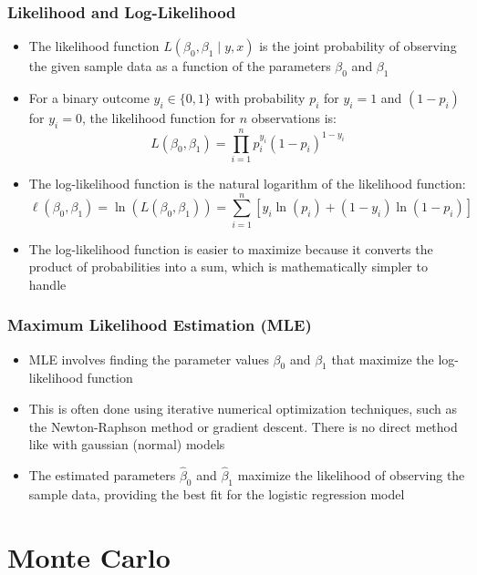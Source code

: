 \documentclass{article}
\begin{document}
\subsubsection{Likelihood and Log-Likelihood}

\begin{itemize}
    \item The likelihood function $L(\beta_0, \beta_1 \mid y, x)$ is the joint probability of observing the given sample data as a function of the parameters $\beta_0$ and $\beta_1$
    \item For a binary outcome $y_i \in \{0,1\}$ with probability $p_i$ for $y_i=1$ and $(1-p_i)$ for $y_i=0$, the likelihood function for $n$ observations is:
    \[
    L(\beta_0, \beta_1) = \prod_{i=1}^{n} p_i^{y_i} (1-p_i)^{1-y_i}
    \]
    \item The log-likelihood function is the natural logarithm of the likelihood function:
    \[
    \ell(\beta_0, \beta_1) = \ln(L(\beta_0, \beta_1)) = \sum_{i=1}^{n} \left[ y_i \ln(p_i) + (1-y_i) \ln(1-p_i) \right]
    \]
    \item The log-likelihood function is easier to maximize because it converts the product of probabilities into a sum, which is mathematically simpler to handle
\end{itemize}

\subsubsection{Maximum Likelihood Estimation (MLE)}

\begin{itemize}
    \item MLE involves finding the parameter values $\beta_0$ and $\beta_1$ that maximize the log-likelihood function
    \item This is often done using iterative numerical optimization techniques, such as the Newton-Raphson method or gradient descent. There is no direct method like with gaussian (normal) models
    \item The estimated parameters $\hat{\beta}_0$ and $\hat{\beta}_1$ maximize the likelihood of observing the sample data, providing the best fit for the logistic regression model
\end{itemize}

\section{Monte Carlo}
\end{document}
